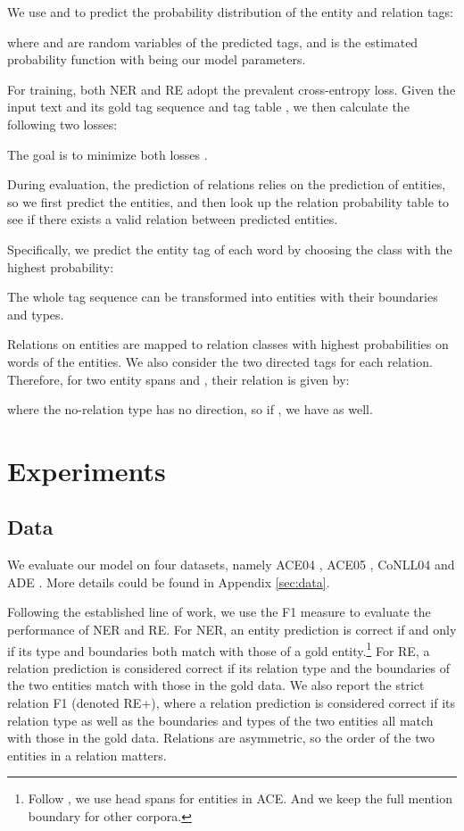 \documentclass[11pt,a4paper]{article}
\begin{document}
We use  and  to predict the probability distribution of the entity and relation tags:

where  and  are random variables of the predicted tags,
and  is the estimated probability function with  being our model parameters.

For training, both NER and RE adopt the prevalent cross-entropy loss.
Given the input text  and its gold tag sequence  and tag table ,
we then calculate the following two losses:


The goal is to minimize both losses .

During evaluation, the prediction of relations relies on the prediction of entities, so we first predict the entities,
and then look up the relation probability table  to see if there exists a valid relation between predicted entities.

Specifically, we predict the entity tag of each word by choosing the class with the highest probability:


The whole tag sequence can be transformed into entities with their boundaries and types.

Relations on entities are mapped to relation classes with highest probabilities on words of the entities.
We also consider the two directed tags for each relation.
Therefore, for two entity spans  and , their relation is given by:

{where the no-relation type  has no direction, so if , we have  as well.}
 
\section{Experiments}
\subsection{Data}

We evaluate our model on four datasets, namely
ACE04 \cite{ace04}, ACE05 \cite{ace05}, CoNLL04 \cite{conll04} and ADE \cite{ade}.
More details could be found in Appendix \ref{sec:data}.

Following the established line of work, we use the F1 measure to evaluate the performance of NER and RE.
For NER, an entity prediction is correct if and only if its type and boundaries both match with those of a gold entity.\footnote{
Follow \citet{li2014incremental,miwa2016end}, we use head spans for entities in ACE. And we keep the full mention boundary for other corpora.}
For RE, a relation prediction is considered correct if its relation type and the boundaries of the two entities match with those in the gold data.
We also report the strict relation F1 (denoted RE{+}), where a relation prediction is considered correct if its relation type as well as the boundaries and types of the two entities all match with those in the gold data.
Relations are asymmetric, so the order of the two entities in a relation matters.
\end{document}
